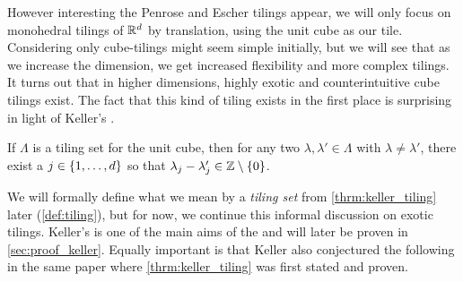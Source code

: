 \documentclass[../thesis.tex]{subfiles}
\begin{document}
However interesting the Penrose and Escher tilings appear, we will only focus on monohedral tilings of $\mathbb{R}^d$ by translation, using the unit cube as our tile. Considering only cube-tilings might seem simple initially, but we will see that as we increase the dimension, we get increased flexibility and more complex tilings. It turns out that in higher dimensions, highly exotic and counterintuitive cube tilings exist. The fact that this kind of tiling exists in the first place is surprising in light of Keller's  \cite{iosevichSpectralTilingProperties1998}.

\begin{theorem}\label{thrm:keller_tiling}
    If $\Lambda$ is a tiling set for the unit cube, then for any two $\lambda, \lambda' \in \Lambda$ with $\lambda\neq\lambda'$, there exist a $j\in \{1,\dots,d\}$ so that $\lambda_j-\lambda_j' \in \mathbb{Z}\setminus\{0\}$.
\end{theorem}

We will formally define what we mean by a \emph{tiling set} from \cref{thrm:keller_tiling} later (\cref{def:tiling}), but for now, we continue this informal discussion on exotic tilings. Keller's  is one of the main aims of the  and will later be proven in \cref{sec:proof_keller}. Equally important is that Keller also conjectured the following in the same paper \cite{kellerUberLuckenloseErfullung1930} where \cref{thrm:keller_tiling} was first stated and proven. 
\end{document}
